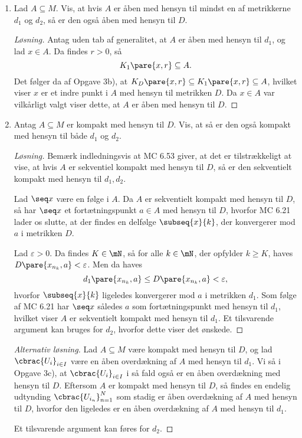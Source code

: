 \documentclass{article}
\begin{document}
\begin{opg}
\begin{enumerate}
\begin{proof}[Løsning]
Lad nu $x\in K_1\pare{a,r}\cap K_2\pare{a,s}$, og antag uden tab af generalitet $D\pare{x,a} = d_1\pare{x,a}$. Da haves
$$ D\pare{x,a} = d_1\pare{x,a} < r \leq \max\cbrac{r,s}, $$
hvilket viser den anden inklusion.
\end{proof}

\item
Lad $A\subseteq M$. Vis, at hvis $A$ er åben med hensyn til mindst en af metrikkerne $d_1$ og $d_2$, så er den også
åben med hensyn til $D$.

\begin{proof}[Løsning]
Antag uden tab af generalitet, at $A$ er åben med hensyn til $d_1$, og lad $x\in A$. Da findes $r>0$, så
$$ K_1\pare{x,r} \subseteq A. $$
Det følger da af Opgave 3b), at $K_D\pare{x,r}\subseteq K_1\pare{x,r} \subseteq A$, hvilket viser $x$ er et indre punkt i $A$ med hensyn til metrikken $D$. Da $x\in A$ var vilkårligt valgt viser dette, at $A$ er åben med hensyn til $D$.
\end{proof}

\item
Antag $A\subseteq M$ er kompakt med hensyn til $D$. Vis, at så er den også kompakt med hensyn til både
$d_1$ og $d_2$.

\begin{proof}[Løsning]
Bemærk indledningsvis at MC 6.53 giver, at det er tilstrækkeligt at vise, at hvis $A$ er sekventiel kompakt med hensyn til $D$, så er den sekventielt kompakt med hensyn til $d_1,d_2$. 

Lad $\seq x$ være en følge i $A$. Da $A$ er sekventielt kompakt med hensyn til $D$, så har $\seq x$ et fortætningspunkt $a\in A$ med hensyn til $D$, hvorfor MC 6.21 lader os slutte, at der findes en delfølge $\subseq{x}{k}$, der konvergerer mod $a$ i metrikken $D$.

Lad $\varepsilon>0$. Da findes $K\in\mN$, så for alle $k\in\mN$, der opfylder $k\geq K$, haves $D\pare{x_{n_k},a} < \varepsilon$. Men da haves
$$ d_1\pare{x_{n_k},a} \leq D\pare{x_{n_k},a} < \varepsilon, $$
hvorfor $\subseq{x}{k}$ ligeledes konvergerer mod $a$ i metrikken $d_1$. Som følge af MC 6.21 har $\seq x$ således $a$ som fortætningspunkt med hensyn til $d_1$, hvilket viser $A$ er sekventielt kompakt med hensyn til $d_1$. Et tilsvarende argument kan bruges for $d_2$, hvorfor dette viser det ønskede.
\end{proof}

\begin{proof}[Alternativ løsning]
Lad $A\subseteq M$ være kompakt med hensyn til $D$, og lad $\cbrac{U_i}_{i\in I}$ være en åben overdækning af $A$ med hensyn til $d_1$. Vi så i Opgave 3c), at $\cbrac{U_i}_{i\in I}$ i så fald også er en åben overdækning med hensyn til $D$. Eftersom $A$ er kompakt med hensyn til $D$, så findes en endelig udtynding $\cbrac{U_{i_n}}_{n=1}^N$ som stadig er åben overdækning af $A$ med hensyn til $D$, hvorfor den ligeledes er en åben overdækning af $A$ med hensyn til $d_1$. 

Et tilsvarende argument kan føres for $d_2$.
\end{proof}

\end{enumerate}
\end{opg}
\end{document}
